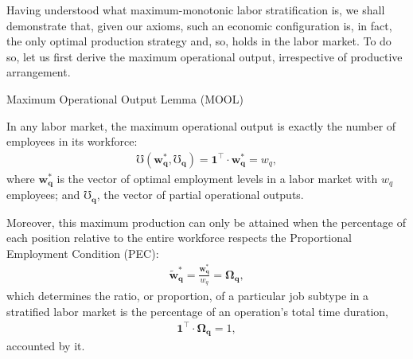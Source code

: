 \documentclass[hidelinks, nonatbib]{elsarticle}
\begin{document}
\begin{enumerate}


Having understood what maximum-monotonic labor stratification is, we shall demonstrate that, given our axioms, such an economic configuration is, in fact, the only optimal production strategy and, so, holds in the labor market. To do so, let us first derive the maximum operational output, irrespective of productive arrangement.

Maximum Operational Output Lemma (MOOL)

    In any labor market, the maximum operational output is exactly the number of employees in its workforce:
    \begin{gather}
        \mho(
            \boldsymbol{w_{q}^{*}},
            \boldsymbol{\mho_q}
        ) = 
        \boldsymbol{1} ^ {\top}
        \cdot
        \boldsymbol{w_{q}^{*}}
        = w_q
        ,
    \end{gather}
    where $\boldsymbol{w_{q}^{*}}$ is the vector of optimal employment levels in a labor market with $w_q$ employees; and $\boldsymbol{\mho_q}$, the vector of partial operational outputs. 
    
    Moreover, this maximum production can only be attained when the percentage of each position relative to the entire workforce respects the Proportional Employment Condition (PEC):
    \begin{gather}
        \boldsymbol{\tilde{w}_{q}^{*}}
        =
        \frac{
            \boldsymbol{w_{q}^{*}}
        }{
            w_q
        }
        =
        \boldsymbol{\Omega_{q}}
        ,
    \end{gather}
    which determines the ratio, or proportion, of a particular job subtype in a stratified labor market is the percentage of an operation's total time duration,
    \begin{gather}
        \boldsymbol{1} ^ {\top}
        \cdot
        \boldsymbol{\Omega_{q}}
        = 1
        ,
    \end{gather}
    accounted by it.
    

\end{enumerate}
\end{document}
